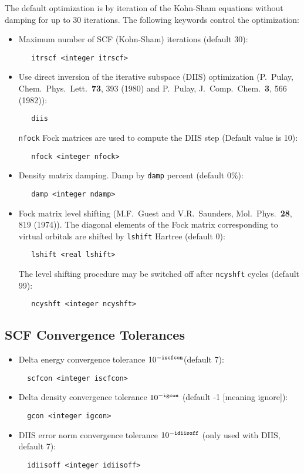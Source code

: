 The default optimization is by iteration of the Kohn-Sham equations
without damping for up to 30 iterations.  The following keywords
control the optimization:
\begin{itemize}
\item Maximum number of SCF (Kohn-Sham) iterations (default 30):
\begin{verbatim}
   itrscf <integer itrscf>
\end{verbatim}
\item Use direct inversion of the iterative subspace (DIIS) optimization
  (P.~Pulay,  Chem.\ Phys.\ Lett.\ {\bf 73}, 393 (1980) and P.~Pulay,
  J.~Comp.~Chem.~{\bf 3}, 566 (1982)):
\begin{verbatim}
   diis
\end{verbatim}
  {\tt nfock} Fock matrices are used to compute the DIIS step
  (Default value is 10):
\begin{verbatim}
   nfock <integer nfock>
\end{verbatim}
\item Density matrix damping. Damp by {\tt damp} percent (default 0\%):
\begin{verbatim}
   damp <integer ndamp>  
\end{verbatim}
\item Fock matrix level shifting (M.F.~Guest and V.R.~Saunders,
  Mol.~Phys.~{\bf 28}, 819 (1974)). The diagonal elements of
the Fock matrix corresponding to virtual orbitals are shifted by 
{\tt  lshift} Hartree (default 0):
\begin{verbatim}
   lshift <real lshift> 
\end{verbatim}
The level shifting procedure may be switched off after {\tt ncyshft} cycles
(default 99):
\begin{verbatim}
   ncyshft <integer ncyshft> 
\end{verbatim}
\end{itemize}

\subsection{SCF Convergence Tolerances}
\begin{itemize}
\item Delta energy convergence tolerance $10^{-{\tt iscfcon}}$(default 7):
\begin{verbatim}
  scfcon <integer iscfcon>
\end{verbatim}
\item Delta density convergence tolerance $10^{-{\tt igcon}}$
  (default -1 [meaning ignore]):
\begin{verbatim}
  gcon <integer igcon>
\end{verbatim}
\item DIIS error norm convergence tolerance $10^{-{\tt idiisoff}}$ 
  (only used with DIIS, default 7):
\begin{verbatim}
  idiisoff <integer idiisoff>
\end{verbatim}
\end{itemize}


